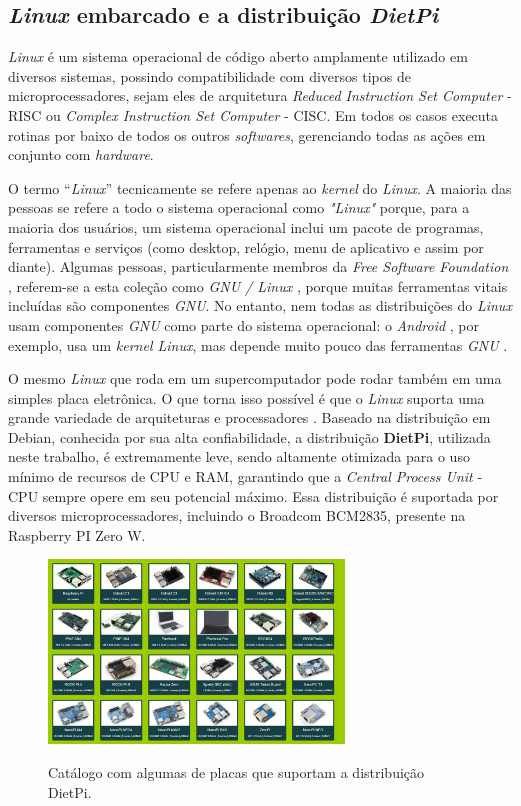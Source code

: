 \subsection{\textit{Linux} embarcado e a distribuição \textit{DietPi}}

\textit{Linux} é um sistema operacional de código aberto amplamente utilizado em diversos sistemas, possindo compatibilidade com diversos tipos de microprocessadores, sejam eles de arquitetura \textit{Reduced Instruction Set Computer} - RISC ou \textit{Complex Instruction Set Computer} - CISC. Em todos os casos executa rotinas por baixo de todos os outros \textit{softwares}, gerenciando todas as ações em conjunto com \textit{hardware}.

O termo “\textit{Linux}” tecnicamente se refere apenas ao \textit{kernel} do \textit{Linux}. A maioria das pessoas se refere a todo o sistema operacional como \textit{"Linux"} porque, para a maioria dos usuários, um sistema operacional inclui um pacote de programas, ferramentas e serviços (como desktop, relógio, menu de aplicativo e assim por diante). Algumas pessoas, particularmente membros da \textit{Free Software Foundation} , referem-se a esta coleção como \textit{GNU / Linux} , porque muitas ferramentas vitais incluídas são componentes \textit{GNU}. No entanto, nem todas as distribuições do \textit{Linux} usam componentes \textit{GNU} como parte do sistema operacional: o \textit{Android} , por exemplo, usa um \textit{kernel Linux}, mas depende muito pouco das ferramentas \textit{GNU} \cite{opensource}.

O mesmo \textit{Linux} que roda em um supercomputador pode rodar também em uma simples placa eletrônica. O que torna isso possível é que o \textit{Linux} suporta uma grande variedade de arquiteturas e processadores \cite{SoftwareLivre}. Baseado na distribuição em Debian, conhecida por sua alta confiabilidade, a distribuição \textbf{DietPi}, utilizada neste trabalho, é extremamente leve, sendo altamente otimizada para o uso mínimo de recursos de CPU e RAM, garantindo que a \textit{Central Process Unit} - CPU sempre opere em seu potencial máximo. Essa distribuição é suportada por diversos microprocessadores, incluindo o Broadcom BCM2835, presente na Raspberry PI Zero W.

\begin{figure}[H]
	\centering
	\caption{Catálogo com algumas de placas que suportam a distribuição DietPi.}
	\includegraphics[width=0.7\textwidth]{figuras/dietpi.jpg}
	\label{fig:dietpi}
\end{figure} 



